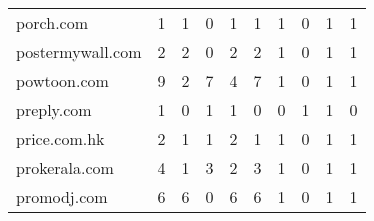 \begin{tabular}{lrrrrrrrrr}
                  porch.com &                                1 &                                  1 &                                      0 &                            1 &                           1 &                                   1 &                                      0 &                             1 &                            1 \\
           postermywall.com &                                2 &                                  2 &                                      0 &                            2 &                           2 &                                   1 &                                      0 &                             1 &                            1 \\
                powtoon.com &                                9 &                                  2 &                                      7 &                            4 &                           7 &                                   1 &                                      0 &                             1 &                            1 \\
                 preply.com &                                1 &                                  0 &                                      1 &                            1 &                           0 &                                   0 &                                      1 &                             1 &                            0 \\
               price.com.hk &                                2 &                                  1 &                                      1 &                            2 &                           1 &                                   1 &                                      0 &                             1 &                            1 \\
              prokerala.com &                                4 &                                  1 &                                      3 &                            2 &                           3 &                                   1 &                                      0 &                             1 &                            1 \\
                promodj.com &                                6 &                                  6 &                                      0 &                            6 &                           6 &                                   1 &                                      0 &                             1 &                            1 \\

\end{tabular}
